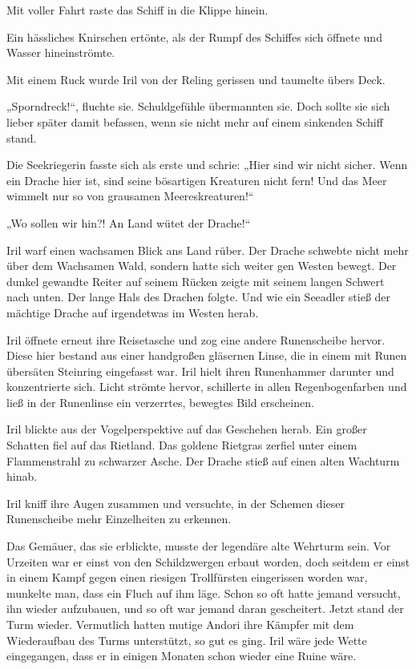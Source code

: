 Mit voller Fahrt raste das Schiff in die Klippe hinein.

Ein hässliches Knirschen ertönte, als der Rumpf des Schiffes sich öffnete und Wasser hineinströmte.

Mit einem Ruck wurde Iril von der Reling gerissen und taumelte übers Deck.

„Sporndreck!“, fluchte sie. Schuldgefühle übermannten sie. Doch sollte sie sich lieber später damit befassen, wenn sie nicht mehr auf einem sinkenden Schiff stand.

Die Seekriegerin fasste sich als erste und schrie: „Hier sind wir nicht sicher. Wenn ein Drache hier ist, sind seine bösartigen Kreaturen nicht fern! Und das Meer wimmelt nur so von grausamen Meereskreaturen!“

„Wo sollen wir hin?! An Land wütet der Drache!“

Iril warf einen wachsamen Blick ans Land rüber. Der Drache schwebte nicht mehr über dem Wachsamen Wald, sondern hatte sich weiter gen Westen bewegt. Der dunkel gewandte Reiter auf seinem Rücken zeigte mit seinem langen Schwert nach unten. Der lange Hals des Drachen folgte. Und wie ein Seeadler stieß der mächtige Drache auf irgendetwas im Westen herab.

Iril öffnete erneut ihre Reisetasche und zog eine andere Runenscheibe hervor. Diese hier bestand aus einer handgroßen gläsernen Linse, die in einem mit Runen übersäten Steinring eingefasst war. Iril hielt ihren Runenhammer darunter und konzentrierte sich. Licht strömte hervor, schillerte in allen Regenbogenfarben und ließ in der Runenlinse ein verzerrtes, bewegtes Bild erscheinen.

Iril blickte aus der Vogelperspektive auf das Geschehen herab. Ein großer Schatten fiel auf das Rietland. Das goldene Rietgras zerfiel unter einem Flammenstrahl zu schwarzer Asche. Der Drache stieß auf einen alten Wachturm hinab.

Iril kniff ihre Augen zusammen und versuchte, in der Schemen dieser Runenscheibe mehr Einzelheiten zu erkennen.

Das Gemäuer, das sie erblickte, musste der legendäre alte Wehrturm sein. Vor Urzeiten war er einst von den Schildzwergen erbaut worden, doch seitdem er einst in einem Kampf gegen einen riesigen Trollfürsten eingerissen worden war, munkelte man, dass ein Fluch auf ihm läge. Schon so oft hatte jemand versucht, ihn wieder aufzubauen, und so oft war jemand daran gescheitert. Jetzt stand der Turm wieder. Vermutlich hatten mutige Andori ihre Kämpfer mit dem Wiederaufbau des Turms unterstützt, so gut es ging. Iril wäre jede Wette eingegangen, dass er in einigen Monaten schon wieder eine Ruine wäre.


